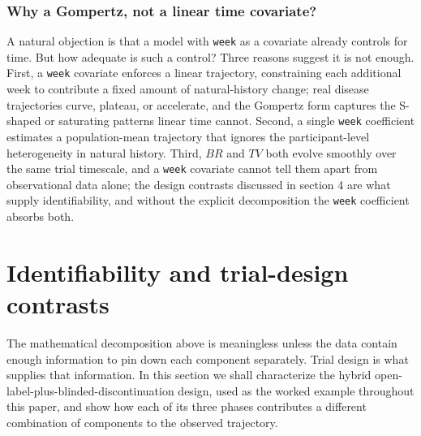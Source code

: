 \documentclass[
  11pt,
]{article}
\begin{document}
\subsubsection{Why a Gompertz, not a linear time covariate?}\label{why-a-gompertz-not-a-linear-time-covariate}

A natural objection is that a model with \texttt{week} as a covariate already
controls for time. But how adequate is such a control? Three reasons suggest
it is not enough. First, a \texttt{week} covariate enforces a linear
trajectory, constraining each additional week to contribute a fixed amount of
natural-history change; real disease trajectories curve, plateau, or
accelerate, and the Gompertz form captures the S-shaped or saturating patterns
linear time cannot. Second, a single \texttt{week} coefficient estimates a
population-mean trajectory that ignores the participant-level heterogeneity in
natural history. Third, \(BR\) and \(TV\) both evolve smoothly over the same trial
timescale, and a \texttt{week} covariate cannot tell them apart from
observational data alone; the design contrasts discussed in section 4 are what
supply identifiability, and without the explicit decomposition the
\texttt{week} coefficient absorbs both.

\section{Identifiability and trial-design contrasts}\label{identifiability-and-trial-design-contrasts}

The mathematical decomposition above is meaningless unless the data contain
enough information to pin down each component separately. Trial design is what
supplies that information. In this section we shall characterize the hybrid
open-label-plus-blinded-discontinuation design, used as the worked example
throughout this paper, and show how each of its three phases contributes a
different combination of components to the observed trajectory.
\end{document}
